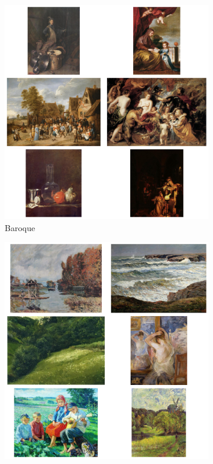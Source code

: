 \documentclass[a4paper,11pt]{article}
\begin{document}
\begin{figure}[htbp]
    \centering
    \begin{subfigure}[t]{.24\textwidth}
        \includegraphics[width=\linewidth]{../figures/Baroque.png}
        \caption{Baroque}
    \end{subfigure}
    \begin{subfigure}[t]{.24\textwidth}
        \includegraphics[width=\linewidth]{../figures/Impressionism.png}

\end{subfigure}
\end{figure}
\end{document}
